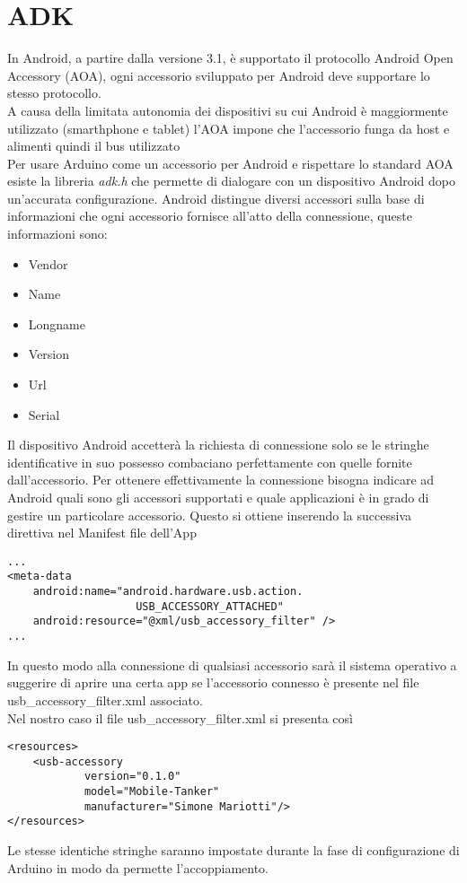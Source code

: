 \section {ADK}
In Android, a partire dalla versione 3.1, è supportato il protocollo Android Open 
Accessory (AOA), 
ogni accessorio sviluppato per Android deve supportare lo stesso protocollo. 
\\A causa della limitata autonomia dei dispositivi su cui Android è maggiormente 
utilizzato (smarthphone e tablet) l'AOA impone che l'accessorio funga da host 
e alimenti quindi il bus utilizzato
\\Per usare Arduino come un accessorio per Android e rispettare lo standard AOA 
esiste la libreria \textit{adk.h} che permette di dialogare con un dispositivo 
Android dopo un'accurata configurazione. Android distingue diversi accessori 
sulla base di informazioni che ogni accessorio fornisce all'atto della connessione, 
queste informazioni sono:
\begin{itemize}
\item Vendor
\item Name
\item Longname
\item Version
\item Url
\item Serial
\end{itemize} 
Il dispositivo Android accetterà la richiesta di connessione solo se le stringhe 
identificative in suo possesso combaciano perfettamente con quelle fornite 
dall'accessorio. Per ottenere effettivamente la connessione bisogna indicare ad 
Android quali sono gli accessori supportati e quale applicazioni è in grado di 
gestire un particolare accessorio. Questo si ottiene inserendo la successiva 
direttiva nel Manifest file dell'App

\lstset{language=XML}

\begin{lstlisting}[caption=Porzione del Manifest file dell'App]
...
<meta-data
    android:name="android.hardware.usb.action.
    				USB_ACCESSORY_ATTACHED"
    android:resource="@xml/usb_accessory_filter" />
...
\end{lstlisting}
In questo modo alla connessione di qualsiasi accessorio sarà il sistema operativo
a suggerire di aprire una certa app se l'accessorio connesso è presente nel file 
usb\_accessory\_filter.xml associato.
\\Nel nostro caso il file usb\_accessory\_filter.xml si presenta così
\begin{lstlisting}[caption=usb\_accessory\_filter.xml]
<resources>
    <usb-accessory
            version="0.1.0"
            model="Mobile-Tanker"
            manufacturer="Simone Mariotti"/>
</resources>
\end{lstlisting}
Le stesse identiche stringhe saranno impostate durante la fase di configurazione 
di Arduino in modo da permette l'accoppiamento.
